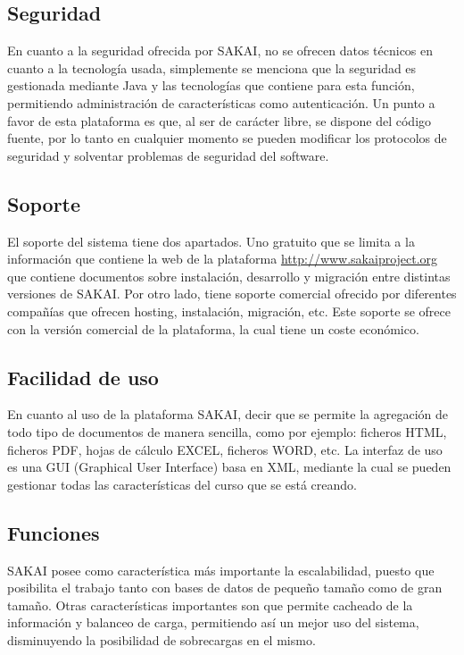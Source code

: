 \subsection{Seguridad}

En cuanto a la seguridad ofrecida por SAKAI\cite{sakai}, no se ofrecen datos técnicos en cuanto a la tecnología usada, simplemente se menciona que la seguridad es gestionada mediante Java y las tecnologías que contiene para esta función, permitiendo administración de características como autenticación. Un punto a favor de esta plataforma es que, al ser de carácter libre, se dispone del código fuente, por lo tanto en cualquier momento se pueden modificar los protocolos de seguridad y solventar problemas de seguridad del software.

\subsection{Soporte}

El soporte del sistema tiene dos apartados. Uno gratuito que se limita a la información que contiene la web de la plataforma \url{http://www.sakaiproject.org} que contiene documentos sobre instalación, desarrollo y migración entre distintas versiones de SAKAI. Por otro lado, tiene soporte comercial ofrecido por diferentes compañías que ofrecen hosting, instalación, migración, etc. Este soporte se ofrece con la versión comercial de la plataforma, la cual tiene un coste económico.

\subsection{Facilidad de uso}

En cuanto al uso de la plataforma SAKAI, decir que se permite la agregación de todo tipo de documentos de manera sencilla, como por ejemplo: ficheros HTML, ficheros PDF, hojas de cálculo EXCEL, ficheros WORD, etc. La interfaz de uso es una GUI (Graphical User Interface) basa en XML, mediante la cual se pueden gestionar todas las características del curso que se está creando.

\subsection{Funciones}

SAKAI posee como característica más importante la escalabilidad, puesto que posibilita el trabajo tanto con bases de datos de pequeño tamaño como de gran tamaño. Otras características importantes son que permite cacheado de la información y balanceo de carga, permitiendo así un mejor uso del sistema, disminuyendo la posibilidad de sobrecargas en el mismo.

